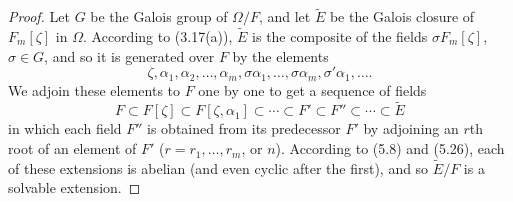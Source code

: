 \begin{proof}
Let $G$ be the Galois group of $\Omega/F$, and let $\widetilde E$ be the Galois closure of $F_m[\zeta]$ in $\Omega$. According to (3.17(a)), $\widetilde E$ is the composite of the fields $\sigma F_m[\zeta]$, $\sigma\in G$, and so it is generated over $F$ by the elements
\[
\zeta,\alpha_1,\alpha_2,\ldots,\alpha_m,\sigma\alpha_1,\ldots,\sigma\alpha_m,
\sigma'\alpha_1,\ldots.
\]
We adjoin these elements to $F$ one by one to get a sequence of fields
\[
F\subset F[\zeta]\subset F[\zeta,\alpha_1]\subset\cdots
\subset F'\subset F''\subset\cdots\subset\widetilde E
\]
in which each field $F''$ is obtained from its predecessor $F'$ by adjoining an $r$th root of an element of $F'$ ($r=r_1,\ldots,r_m$, or $n$). According to (5.8) and (5.26), each of these extensions is abelian (and even cyclic after the first), and so $\widetilde E/F$ is a solvable extension.
\end{proof}
